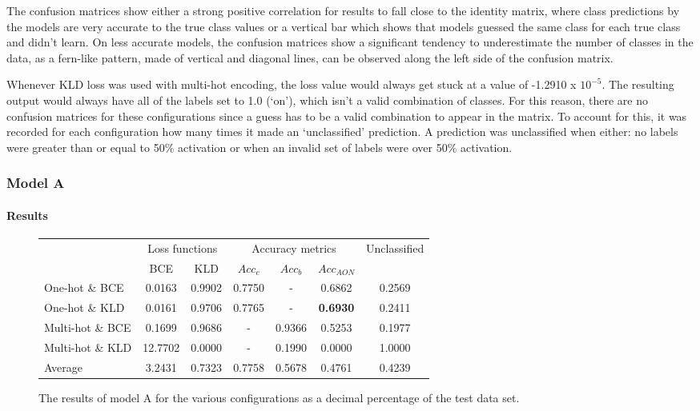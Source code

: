 \documentclass[12pt]{article}
\begin{document}
    The confusion matrices show either a strong positive correlation for results to fall close to the identity matrix, where class predictions by the models are very accurate to the true class values or a vertical bar which shows that models guessed the same class for each true class and didn't learn. On less accurate models, the confusion matrices show a significant tendency to underestimate the number of classes in the data, as a fern-like pattern, made of vertical and diagonal lines, can be observed along the left side of the confusion matrix.\medskip
    
    Whenever KLD loss was used with multi-hot encoding, the loss value would always get stuck at a value of -1.2910 x $10^{-5}$. The resulting output would always have all of the labels set to 1.0 (`on'), which isn't a valid combination of classes. For this reason, there are no confusion matrices for these configurations since a guess has to be a valid combination to appear in the matrix. To account for this, it was recorded for each configuration how many times it made an `unclassified' prediction. A prediction was unclassified when either: no labels were greater than or equal to 50\% activation or when an invalid set of labels were over 50\% activation.
    
	\subsubsection{Model A}
	\label{sec:evaluation_analysis_modelA}
	
	\paragraph*{Results}
	
	\begin{figure}[H]
	    \centering
	    \begin{tabular}{l|c|c|c|c|c|c|}
	        & \multicolumn{2}{c|}{Loss functions} & \multicolumn{3}{c|}{Accuracy metrics} & \multirow{2}{*}{Unclassified}\\
	        \cline{2-6}
	        & BCE & KLD & $Acc_{c}$ & $Acc_{b}$ & $Acc_{AON}$ & \\
	        \hline
	        One-hot \& BCE & 0.0163 & 0.9902 & 0.7750 & - & 0.6862 & 0.2569\\
	        \hline
	        One-hot \& KLD & 0.0161 & 0.9706 & 0.7765 & - & \textbf{0.6930} & 0.2411\\
	        \hline
	        Multi-hot \& BCE & 0.1699 & 0.9686 & - & 0.9366 & 0.5253 & 0.1977\\
	        \hline
	        Multi-hot \& KLD & 12.7702 & 0.0000 & - & 0.1990 & 0.0000 & 1.0000\\
	        \bottomrule
	        Average & 3.2431 & 0.7323 & 0.7758 & 0.5678 & 0.4761 & 0.4239\\
	       \bottomrule
	    \end{tabular}
	    \caption{The results of model A for the various configurations as a decimal percentage of the test data set.}
	    \label{fig:modelA}
	\end{figure}
	
\end{document}
